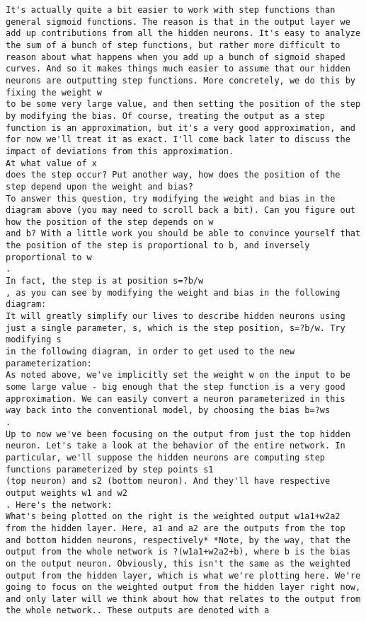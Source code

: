 \begin{lstlisting}
It's actually quite a bit easier to work with step functions than general sigmoid functions. The reason is that in the output layer we add up contributions from all the hidden neurons. It's easy to analyze the sum of a bunch of step functions, but rather more difficult to reason about what happens when you add up a bunch of sigmoid shaped curves. And so it makes things much easier to assume that our hidden neurons are outputting step functions. More concretely, we do this by fixing the weight w
to be some very large value, and then setting the position of the step by modifying the bias. Of course, treating the output as a step function is an approximation, but it's a very good approximation, and for now we'll treat it as exact. I'll come back later to discuss the impact of deviations from this approximation.
At what value of x
does the step occur? Put another way, how does the position of the step depend upon the weight and bias?
To answer this question, try modifying the weight and bias in the diagram above (you may need to scroll back a bit). Can you figure out how the position of the step depends on w
and b? With a little work you should be able to convince yourself that the position of the step is proportional to b, and inversely proportional to w
.
In fact, the step is at position s=?b/w
, as you can see by modifying the weight and bias in the following diagram:
It will greatly simplify our lives to describe hidden neurons using just a single parameter, s, which is the step position, s=?b/w. Try modifying s
in the following diagram, in order to get used to the new parameterization:
As noted above, we've implicitly set the weight w on the input to be some large value - big enough that the step function is a very good approximation. We can easily convert a neuron parameterized in this way back into the conventional model, by choosing the bias b=?ws
.
Up to now we've been focusing on the output from just the top hidden neuron. Let's take a look at the behavior of the entire network. In particular, we'll suppose the hidden neurons are computing step functions parameterized by step points s1
(top neuron) and s2 (bottom neuron). And they'll have respective output weights w1 and w2
. Here's the network:
What's being plotted on the right is the weighted output w1a1+w2a2 from the hidden layer. Here, a1 and a2 are the outputs from the top and bottom hidden neurons, respectively* *Note, by the way, that the output from the whole network is ?(w1a1+w2a2+b), where b is the bias on the output neuron. Obviously, this isn't the same as the weighted output from the hidden layer, which is what we're plotting here. We're going to focus on the weighted output from the hidden layer right now, and only later will we think about how that relates to the output from the whole network.. These outputs are denoted with a

\end{lstlisting}
